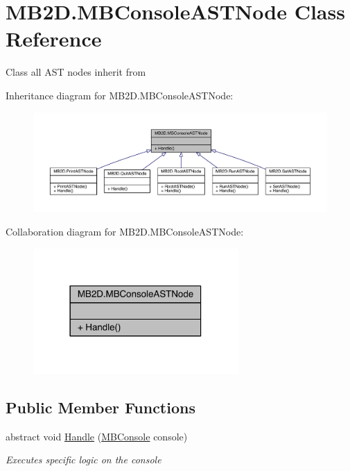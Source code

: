 \hypertarget{class_m_b2_d_1_1_m_b_console_a_s_t_node}{}\section{M\+B2\+D.\+M\+B\+Console\+A\+S\+T\+Node Class Reference}
\label{class_m_b2_d_1_1_m_b_console_a_s_t_node}


Class all A\+ST nodes inherit from  




Inheritance diagram for M\+B2\+D.\+M\+B\+Console\+A\+S\+T\+Node\+:\nopagebreak
\begin{figure}[H]
\begin{center}
\leavevmode
\includegraphics[width=350pt]{class_m_b2_d_1_1_m_b_console_a_s_t_node__inherit__graph}
\end{center}
\end{figure}


Collaboration diagram for M\+B2\+D.\+M\+B\+Console\+A\+S\+T\+Node\+:\nopagebreak
\begin{figure}[H]
\begin{center}
\leavevmode
\includegraphics[width=222pt]{class_m_b2_d_1_1_m_b_console_a_s_t_node__coll__graph}
\end{center}
\end{figure}
\subsection*{Public Member Functions}
\begin{DoxyCompactItemize}
\item 
abstract void \hyperlink{class_m_b2_d_1_1_m_b_console_a_s_t_node_aa70a49e61ab623698af4ed8fda4ebbf5}{Handle} (\hyperlink{class_m_b2_d_1_1_m_b_console}{M\+B\+Console} console)
\begin{DoxyCompactList}\small\item\em Executes specific logic on the console \end{DoxyCompactList}\end{DoxyCompactItemize}


